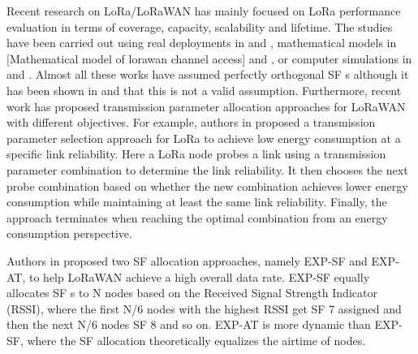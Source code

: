 Recent research on LoRa/LoRaWAN has mainly focused on LoRa performance evaluation in terms of coverage,
	capacity,
	scalability and lifetime.
The studies have been carried out using real deployments in \cite{oliveira_long_2017} and \cite{petajajarvi_performance_2017},
	mathematical models in [Mathematical model of lorawan channel access] and \cite{georgiou_low_2017},
	or computer simulations in \cite{bor_lora_2016} and \cite{magrin_performance_2017}.
Almost all these works have assumed perfectly orthogonal SF s although it has been shown in \cite{mikhaylov_lorawan_2017} and \cite{piva_impact_2017} that this is not a valid assumption.
Furthermore,
	recent work has proposed transmission parameter allocation approaches for LoRaWAN with different objectives.
For example,
	authors in \cite{bor_lora_2017} proposed a transmission parameter selection approach for LoRa to achieve low energy consumption at a specific link reliability.
Here a LoRa node probes a link using a transmission parameter combination to determine the link reliability.
It then chooses the next probe combination based on whether the new combination achieves lower energy consumption while maintaining at least the same link reliability.
Finally,
	the approach terminates when reaching the optimal combination from an energy consumption perspective.

Authors in \cite{cuomo_explora_2017} proposed two SF allocation approaches,
	namely EXP-SF and EXP-AT,
	to help LoRaWAN achieve a high overall data rate.
EXP-SF equally allocates SF s to N nodes based on the Received Signal Strength Indicator (RSSI),
	where the first N/6 nodes with the highest RSSI get SF 7 assigned and then the next N/6 nodes SF 8 and so on.
EXP-AT is more dynamic than EXP-SF,
	where the SF allocation theoretically equalizes the airtime of nodes.

